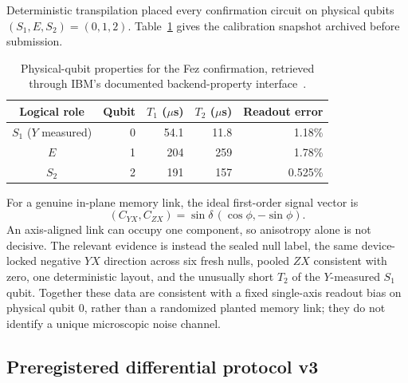 \documentclass[aps,prl,onecolumn,superscriptaddress,nofootinbib]{revtex4-2}
\begin{document}
Deterministic transpilation placed every confirmation circuit on physical qubits $(S_1,E,S_2)=(0,1,2)$.  Table~\ref{tab:fez-qubits} gives the calibration snapshot archived before submission.
\begin{table}[t]
\caption{Physical-qubit properties for the Fez confirmation, retrieved through IBM's documented backend-property interface~\cite{IBMBackendDetails2026}.}
\label{tab:fez-qubits}
\begin{ruledtabular}
\begin{tabular}{crrrr}
Logical role & Qubit & $T_1$ ($\mu$s) & $T_2$ ($\mu$s) & Readout error\\
\hline
$S_1$ ($Y$ measured) & 0 & 54.1 & 11.8 & 1.18\%\\
$E$ & 1 & 204 & 259 & 1.78\%\\
$S_2$ & 2 & 191 & 157 & 0.525\%\\
\end{tabular}
\end{ruledtabular}
\end{table}

For a genuine in-plane memory link, the ideal first-order signal vector is
\begin{equation}
 (C_{YX},C_{ZX})=\sin\delta\,(\cos\phi,-\sin\phi).
 \label{eq:dark-signal-vector}
\end{equation}
An axis-aligned link can occupy one component, so anisotropy alone is not decisive.  The relevant evidence is instead the sealed null label, the same device-locked negative $YX$ direction across six fresh nulls, pooled $ZX$ consistent with zero, one deterministic layout, and the unusually short $T_2$ of the $Y$-measured $S_1$ qubit.  Together these data are consistent with a fixed single-axis readout bias on physical qubit 0, rather than a randomized planted memory link; they do not identify a unique microscopic noise channel.

\subsection{Preregistered differential protocol v3}
\end{document}
